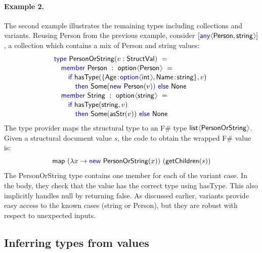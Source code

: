 \documentclass[10pt,preprint,blind,clearpagebib]{sigplanconf}
\newcommand{\langl}{\begin{picture}(4.5,7)
\put(1.1,2.5){\rotatebox{60}{\line(1,0){5.5}}}
\put(1.1,2.5){\rotatebox{300}{\line(1,0){5.5}}}
\end{picture}}
\newcommand{\rangl}{\begin{picture}(4.5,7)
\put(.9,2.5){\rotatebox{120}{\line(1,0){5.5}}}
\put(.9,2.5){\rotatebox{240}{\line(1,0){5.5}}}
\end{picture}}
\newcommand{\kvd}[1]{\textnormal{\textcolor{kvdclr}{\sffamily #1}}}
\newcommand{\ident}[1]{\textnormal{\sffamily #1}}
\begin{document}
\paragraph{Example 2.} The second example illustrates the remaining types including collections and 
variants. Reusing \ident{Person} from the previous example, consider 
$[\kvd{any}\langl\ident{Person},\ident{string}\rangl]$, a collection which contains a mix 
of \ident{Person} and string values:
%
\begin{equation*}
\begin{array}{l}
 \kvd{type}~\ident{PersonOrString}(v:\ident{StructVal})~= \\[0.1em]
 \quad \kvd{member}~\ident{Person}~:~\ident{option}\langl\ident{Person}\rangl~= \\[0.1em]
 \qquad \kvd{if}~\ident{hasType}(\{\ident{Age}\!:\!\kvd{option}\langl\ident{int}\rangl, \ident{Name}\!:\!\ident{string}\}, v)~\\[0.1em]
 \qquad\quad \kvd{then}~\ident{Some}(\kvd{new}~\ident{Person}(v))~\kvd{else}~\ident{None} \\[0.1em]
 \quad \kvd{member}~\ident{String}~:~\ident{option}\langl\ident{string}\rangl~= \\[0.1em]
 \qquad \kvd{if}~\ident{hasType}(\ident{string}, v)~\\[0.1em]
 \qquad\quad \kvd{then}~\ident{Some}(\ident{asStr}(v))~\kvd{else}~\ident{None}
\end{array}
\end{equation*}
%
The type provider maps the structural type to an F\# type $\ident{list}\langl\ident{PersonOrString}\rangl$. 
Given a structural document value $s$, the code to obtain the wrapped F\# value is:
%
\begin{equation*}
\ident{map}~(\lambda x\rightarrow\kvd{new}~\ident{PersonOrString}(x))~(\ident{getChildren}(s))
\end{equation*}
%
The \ident{PersonOrString} type contains one member for each of the variant case. In the body, they
check that the value has the correct type using \ident{hasType}. This also implicitly handles \kvd{null}
by returning \kvd{false}. As discussed earlier, variants provide easy access to the known cases
(\ident{string} or \ident{Person}), but they are robust with respect to unexpected inputs.


\subsection{Inferring types from values}
\label{sec:formal-inferval}
\end{document}
